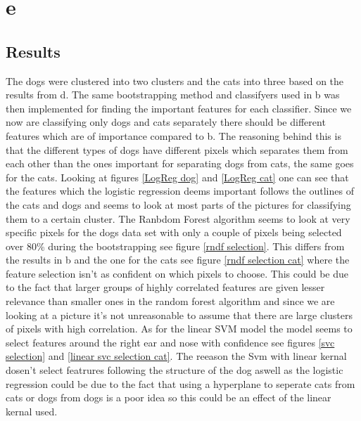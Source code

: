 \documentclass{article}
\begin{document}
\section{e}
\subsection{Results}
The dogs were clustered into two clusters and the cats into three based on the results from d. The same bootstrapping method  and classifyers used in b was then implemented for finding the important features for each classifier. Since we now are classifying only dogs and cats separately there should be different features which are of importance compared to b. The reasoning behind this is that the different types of dogs have different pixels which separates them from each other than the ones important for separating dogs from cats, the same goes for the cats. Looking at figures \ref{LogReg dog} and \ref{LogReg cat} one can see that the features which the logistic regression deems important follows the outlines of the cats and dogs and seems to look at most parts of the pictures for classifying them to a certain cluster. The Ranbdom Forest algorithm seems to look at very specific pixels for the dogs data set with only a couple of pixels being selected over 80\% during the bootstrapping see figure \ref{rndf selection}. This differs from the results in b and the one for the cats see figure \ref{rndf selection cat} where the feature selection isn't as confident on which pixels to choose. This could be due to the fact that larger groups of highly correlated features are given lesser relevance than smaller ones in the random forest algorithm and since we are looking at a picture it's not unreasonable to assume that there are large clusters of pixels with high correlation. As for the linear SVM model the model seems to select features around the right ear and nose with confidence see figures \ref{svc selection} and \ref{linear svc selection cat}. The reeason the Svm with linear kernal dosen't select featrures following the structure of the dog aswell as the logistic regression could be due to the fact that using a hyperplane to seperate cats from cats or dogs from dogs is a poor idea so this could be an effect of the linear kernal used. 
\end{document}
